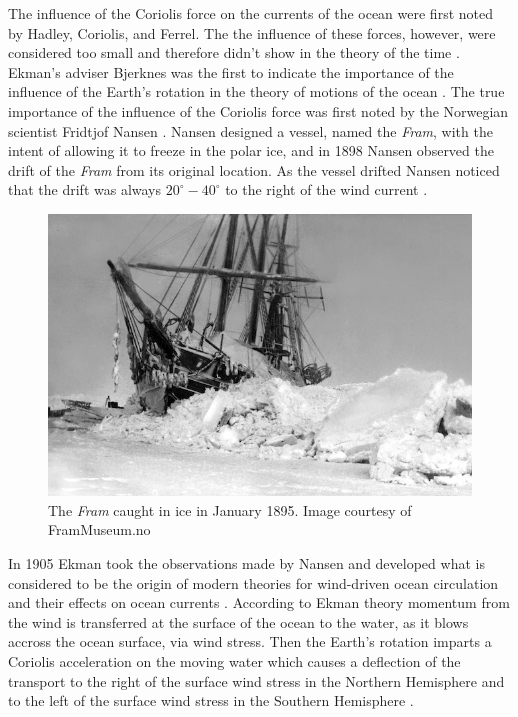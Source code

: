 The influence of the Coriolis force on the currents of the ocean were first
noted by Hadley, Coriolis, and Ferrel. The the influence of these forces,
however, were considered too small and therefore didn't show in the theory of
the time \cite{Ekman1905}. Ekman's adviser Bjerknes was the first to indicate
the importance of the influence of the Earth's rotation in the theory of motions
of the ocean \cite{Ekman1905}. The true importance of the influence of the
Coriolis force was first noted by the Norwegian scientist Fridtjof Nansen
\cite{Beesley2008, Ekman1905}. Nansen designed a vessel, named the \emph{Fram},
with the intent of allowing it to freeze in the polar ice, and in 1898 Nansen
observed the drift of the \emph{Fram} from its original location. As the vessel
drifted Nansen noticed that the drift was always $20^\circ - 40^\circ$ to the
right of the wind current \cite{Beesley2008}.

\begin{figure}
  \includegraphics[scale=0.35]{Figures/Fram.jpg}
  \caption{The \emph{Fram} caught in ice in January 1895. Image courtesy of
  FramMuseum.no}
  \label{fig:Fram}
\end{figure}
In 1905 Ekman \cite{Ekman1905} took the observations made by Nansen and developed
what is considered to be the origin of modern theories for wind-driven ocean
circulation and their effects on ocean currents \cite{Price1987}. According to
Ekman theory momentum from the wind is transferred at the surface of the ocean
to the water, as it blows accross the ocean surface, via wind stress. Then the
Earth's rotation imparts a Coriolis acceleration on the moving water which
causes a deflection of the transport to the right of the surface wind stress in
the Northern Hemisphere and to the left of the surface wind stress in the
Southern Hemisphere \cite{Beesley2008}.

